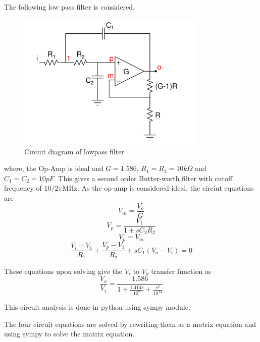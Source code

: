 \documentclass[12pt, a4paper]{article}
\begin{document}
The following low pass filter is considered.
\begin{figure}[H]
\centering
\includegraphics[width=0.8\textwidth]{lowpass.png}
\caption{Circuit diagram of lowpass filter}
\end{figure}
where, the Op-Amp is ideal and $G = 1.586$, $R_1 = R_2  = 10k\Omega$ and $C_1 = C_2 = 10pF$. This gives a second order Butter-worth filter with cutoff frequency of $10/2\pi$MHz.
As the op-amp is considered ideal, the circiut equations are
\begin{equation}
V_m = \frac{V_o}{G}
\end{equation}
\begin{equation}
V_p = \frac{V_1}{1 + sC_2 R_2}
\end{equation}
\begin{equation}
V_p = V_m 
\end{equation}
\begin{equation}
\frac{V_i - V_1}{R_1} + \frac{V_p - V_1}{R_2} + sC_1(V_o - V_i) = 0
\end{equation}

These equations upon solving give the $V_i$ to $V_o$ transfer function as
\begin{equation*}
\frac{V_o}{V_i} = \frac{1.586}{1 + \frac{1.414s}{10^7} + \frac{s^2}{10^{14}}}
\end{equation*}

This circuit analysis is done in python using sympy module.

The four circuit equations are solved by rewriting them as a matrix equation and using sympy to solve the matrix equation.
\end{document}
